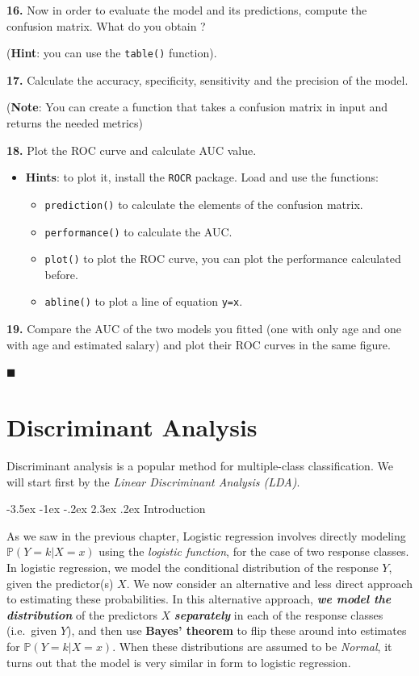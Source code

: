 \documentclass[]{book}
\makeatletter
\providecommand{\tightlist}{%
  \setlength{\itemsep}{0pt}\setlength{\parskip}{0pt}}
\newenvironment{rmdblock}[1]
  {\begin{shaded*}
  \begin{itemize}
  \renewcommand{\labelitemi}{
    \raisebox{-.7\height}[0pt][0pt]{
      {\setkeys{Gin}{width=2em,keepaspectratio}\texttt{[image: img/icons/\#1]}}
    }
  }
  \item
  }
  {
  \end{itemize}
  \end{shaded*}
  }
\newenvironment{rmdinsight}
  {\begin{rmdblock}{insight}}
  {\end{rmdblock}}
\renewcommand\section{\@startsection {section}{1}{\z@}%
                                   {-3.5ex \@plus -1ex \@minus -.2ex}%
                                   {2.3ex \@plus.2ex}%
                                   {\normalfont\Large\bfseries\color{ForestGreen}}}
\theoremstyle{definition}
\theoremstyle{definition}
\theoremstyle{definition}
\theoremstyle{remark}
\makeatother
\begin{document}
\textbf{16.} Now in order to evaluate the model and its predictions,
compute the confusion matrix. What do you obtain ?

(\textbf{Hint}: you can use the \texttt{table()} function).

\textbf{17.} Calculate the accuracy, specificity, sensitivity and the
precision of the model.

(\textbf{Note}: You can create a function that takes a confusion matrix
in input and returns the needed metrics)

\textbf{18.} Plot the ROC curve and calculate AUC value.

\begin{rmdinsight}
\textbf{Hints}: to plot it, install the \texttt{ROCR} package. Load and
use the functions:

\begin{itemize}
\tightlist
\item
  \texttt{prediction()} to calculate the elements of the confusion
  matrix.
\item
  \texttt{performance()} to calculate the AUC.
\item
  \texttt{plot()} to plot the ROC curve, you can plot the performance
  calculated before.
\item
  \texttt{abline()} to plot a line of equation \texttt{y=x}.
\end{itemize}
\end{rmdinsight}

\textbf{19.} Compare the AUC of the two models you fitted (one with only
age and one with age and estimated salary) and plot their ROC curves in
the same figure.

◼

\chapter{Discriminant Analysis}\label{discriminant-analysis}

Discriminant analysis is a popular method for multiple-class
classiﬁcation. We will start first by the \emph{Linear Discriminant
Analysis (LDA)}.

\section{Introduction}\label{introduction-2}

As we saw in the previous chapter, Logistic regression involves directly
modeling \(\mathbb{P} (Y = k|X = x)\) using the \emph{logistic
function}, for the case of two response classes. In logistic regression,
we model the conditional distribution of the response \(Y\), given the
predictor(s) \(X\). We now consider an alternative and less direct
approach to estimating these probabilities. In this alternative
approach, \textbf{\emph{we model the distribution}} of the predictors
\(X\) \textbf{\emph{separately}} in each of the response classes
(i.e.~given \(Y\)), and then use \textbf{Bayes' theorem} to flip these
around into estimates for \(\mathbb{P} (Y = k|X = x)\). When these
distributions are assumed to be \emph{Normal}, it turns out that the
model is very similar in form to logistic regression.
\end{document}

